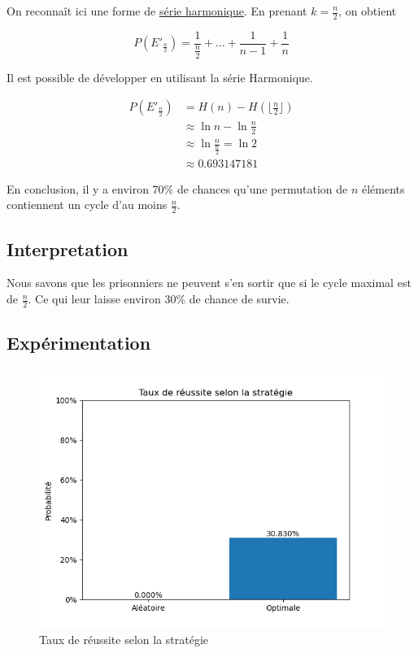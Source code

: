 	On reconnaît ici une forme de \href{https://en.wikipedia.org/wiki/Harmonic_series_(mathematics)#}{série harmonique}.
	En prenant $k = \frac{n}{2}$, on obtient

	\begin{equation}
		P(E'_{\frac{n}{2}}) = \frac{1}{\frac{n}{2}} + \hdots + \frac{1}{n - 1} + \frac{1}{n}
	\end{equation}

	Il est possible de développer en utilisant la série Harmonique.

	\begin{align*}
		P(E'_{\frac{n}{2}}) & = H(n) - H(\lfloor \frac{n}{2} \rfloor)     \\
		                    & \approx \ln{n} - \ln{\frac{n}{2}}           \\
		                    & \approx \ln{\frac{n}{\frac{n}{2}}} = \ln{2} \\
		                    & \approx 0.693147181
	\end{align*}

	En conclusion, il y a environ 70\% de chances qu'une permutation de $n$ éléments contiennent un cycle d'au moins $\frac{n}{2}$.

\subsection{Interpretation}

	Nous savons que les prisonniers ne peuvent s'en sortir que si le cycle maximal est de $\frac{n}{2}$.
	Ce qui leur laisse environ 30\% de chance de survie.

\subsection{Expérimentation}

\begin{figure}[h]
  \includegraphics[width=\linewidth]{./strategies_succes.png}
  \caption{Taux de réussite selon la stratégie}
  \label{fig:strategies_success}
\end{figure}

